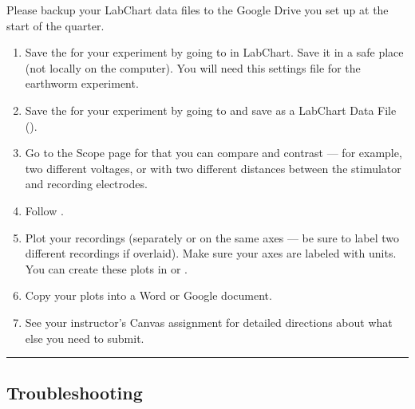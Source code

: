 \documentclass[letterpaper,10pt,english]{jupyterBook}
\begin{document}
\sphinxAtStartPar
Please backup your LabChart data files to the Google Drive you set up at the start of the quarter.
\begin{enumerate}
%
\item {} 
\sphinxAtStartPar
Save the  for your experiment by going to  in LabChart. Save it in a safe place (not locally on the computer). You will need this settings file for the earthworm experiment.

\item {} 
\sphinxAtStartPar
Save the  for your experiment by going to  and save as a LabChart Data File ().

\item {} 
\sphinxAtStartPar
Go to the Scope page for  that you can compare and contrast — for example, two different voltages, or with two different distances between the stimulator and recording electrodes.

\item {} 
\sphinxAtStartPar
Follow .

\item {} 
\sphinxAtStartPar
Plot your recordings (separately or on the same axes — be sure to label two different recordings if overlaid). Make sure your axes are labeled with units. You can create these plots in  or .

\item {} 
\sphinxAtStartPar
Copy your plots into a Word or Google document.

\item {} 
\sphinxAtStartPar
See your instructor’s Canvas assignment for detailed directions about what else you need to submit.

\end{enumerate}


\bigskip\hrule\bigskip



\subsection{Troubleshooting}
\label{\detokenize{StringNervousSystems:troubleshooting}}
\end{document}
